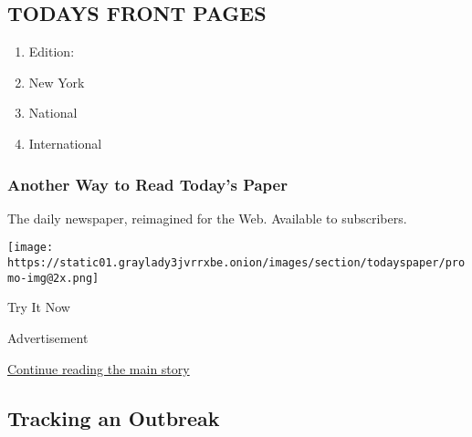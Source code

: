 \hypertarget{todays-front-pages}{%
\subsection{TODAYS FRONT PAGES}\label{todays-front-pages}}

\begin{enumerate}
\def\labelenumi{\arabic{enumi}.}
\tightlist
\item
  Edition:
\item
  New York
\item
  National
\item
  International
\end{enumerate}

\href{http://app.nytimes3xbfgragh.onion/todayspaper}{}

\hypertarget{another-way-to-read-todays-paper}{%
\subsubsection{Another Way to Read Today's
Paper}\label{another-way-to-read-todays-paper}}

The daily newspaper, reimagined for the Web. Available to subscribers.

\texttt{[image: https://static01.graylady3jvrrxbe.onion/images/section/todayspaper/promo-img@2x.png]}

Try It Now

Advertisement

\protect\hyperlink{after-mid1}{Continue reading the main story}

\hypertarget{tracking-an-outbreak}{%
\subsection{Tracking an Outbreak}\label{tracking-an-outbreak}}

